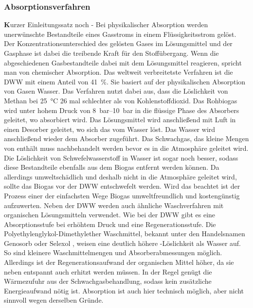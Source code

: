 \subsubsection{Absorptionsverfahren}\label{chap:absorp}

{\textbf Kurzer Einleitungssatz noch -} Bei physikalischer Absorption werden unerwünschte Bestandteile eines Gasstroms in einem Flüssigkeitsstrom gelöst. Der Konzentrationsunterschied des gelösten Gases im Lösungsmittel und der Gasphase ist dabei die treibende Kraft für den Stoffübergang. Wenn die abgeschiedenen Gasbestandteile dabei mit dem Lösungsmittel reagieren, spricht man von chemischer Absorption. \parencite{Rasi09} \newline
Das weltweit verbreitetste Verfahren ist die \gls{DWW} mit einem Anteil von \SI{41}{\percent}. Sie basiert auf der physikalischen Absorption von Gasen Wasser. Das Verfahren nutzt dabei aus, dass die Löslichkeit von Methan bei \SI{25}{\degreeCelsius} \SI{26}{\relax} mal schlechter als von Kohlenstoffdioxid. Das Rohbiogas wird unter hohem Druck von \SIrange{8}{10}{\bar} in die flüssige Phase des Absorbers geleitet, wo  absorbiert wird. Das Lösungsmittel wird anschließend mit Luft in einen Desorber geleitet, wo sich das  vom Wasser löst. Das Wasser wird anschließend wieder dem Absorber zugeführt. Das Schwachgas, das kleine Mengen von  enthält muss nachbehandelt werden bevor es in die Atmosphäre geleitet wird.
Die Löslichkeit von Schwefelwasserstoff  in Wasser ist sogar noch besser, sodass diese Bestandteile ebenfalls aus dem Biogas entfernt werden können. Da  allerdings umweltschädlich und deshalb nicht in die Atmosphäre geleitet wird, sollte das Biogas vor der \gls{DWW} entschwefelt werden. Wird das beachtet ist der Prozess einer der einfachsten Wege Biogas umweltfreundlich und kostengünstig aufzuwerten. \parencite{KGKK2019} \parencite{BHPT13} \newline
Neben der \gls{DWW} werden auch ähnliche Waschverfahren mit organischen Lösungsmitteln verwendet. Wie bei der \gls{DWW} gibt es eine Absorptionsstufe bei erhöhtem Druck und eine Regenerationsstufe. Die Polyethylenglykol-Dimethylether Waschmittel, bekannt unter den Handelsnamen Genosorb \textsuperscript{\textregistered} oder Selexol \textsuperscript{\textregistered}, weisen eine deutlich höhere -Löslichkeit als Wasser auf. So sind kleinere Waschmittelmengen und Absorberabmessungen möglich. Allerdings ist der Regenerationsaufwand der organischen Mittel höher, da sie neben entspannt auch erhitzt werden müssen. In der Regel genügt die Wärmezufuhr aus der Schwachgasbehandlung, sodass kein zusätzliche Energieaufwand nötig ist.  Absorption ist auch hier technisch möglich, aber nicht sinnvoll wegen derselben Gründe. \parencite{FNR14} \newline
